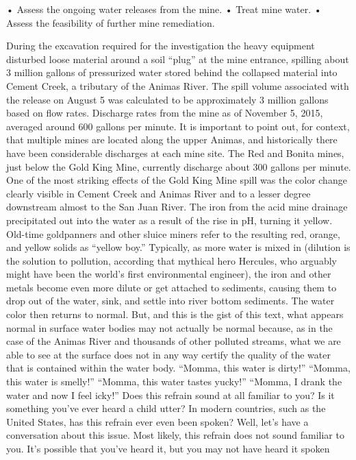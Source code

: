 \documentclass{article}
\begin{document}
• Assess the ongoing water releases from the mine. • Treat mine water. •
Assess the feasibility of further mine remediation.

During the excavation required for the investigation the heavy equipment
disturbed loose material around a soil ``plug'' at the mine entrance,
spilling about 3 million gallons of pressurized water stored behind the
collapsed material into Cement Creek, a tributary of the Animas River.
The spill volume associated with the release on August 5 was calculated
to be approximately 3 million gallons based on flow rates. Discharge
rates from the mine as of November 5, 2015, averaged around 600 gallons
per minute. It is important to point out, for context, that multiple
mines are located along the upper Animas, and historically there have
been considerable discharges at each mine site. The Red and Bonita
mines, just below the Gold King Mine, currently discharge about 300
gallons per minute. One of the most striking effects of the Gold King
Mine spill was the color change clearly visible in Cement Creek and
Animas River and to a lesser degree downstream almost to the San Juan
River. The iron from the acid mine drainage precipitated out into the
water as a result of the rise in pH, turning it yellow. Old-time
goldpanners and other sluice miners refer to the resulting red, orange,
and yellow solids as ``yellow boy.'' Typically, as more water is mixed
in (dilution is the solution to pollution, according that mythical hero
Hercules, who arguably might have been the world's first environmental
engineer), the iron and other metals become even more dilute or get
attached to sediments, causing them to drop out of the water, sink, and
settle into river bottom sediments. The water color then returns to
normal. But, and this is the gist of this text, what appears normal in
surface water bodies may not actually be normal because, as in the case
of the Animas River and thousands of other polluted streams, what we are
able to see at the surface does not in any way certify the quality of
the water that is contained within the water body. ``Momma, this water
is dirty!'' ``Momma, this water is smelly!'' ``Momma, this water tastes
yucky!'' ``Momma, I drank the water and now I feel icky!'' Does this
refrain sound at all familiar to you? Is it something you've ever heard
a child utter? In modern countries, such as the United States, has this
refrain ever even been spoken? Well, let's have a conversation about
this issue. Most likely, this refrain does not sound familiar to you.
It's possible that you've heard it, but you may not have heard it spoken
\end{document}
